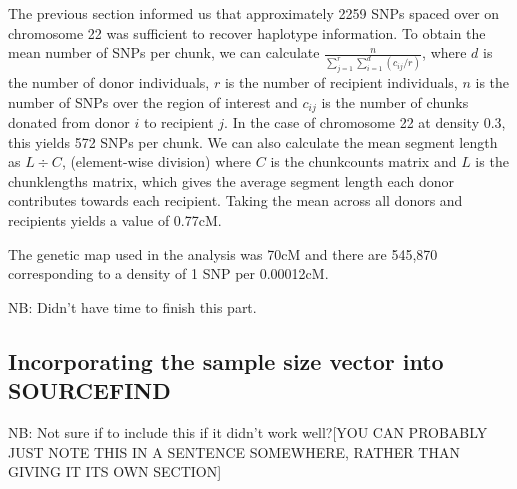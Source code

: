 The previous section informed us that approximately 2259 SNPs spaced over on chromosome 22 was sufficient to recover haplotype information. To obtain the mean number of SNPs per chunk, we can calculate $\frac{n}{\sum_{j=1}^{r} \sum_{i=1}^{d} (c_{ij}/r)}$, where $d$ is the number of donor individuals, $r$ is the number of recipient individuals, $n$ is the number of SNPs over the region of interest and $c_{ij}$ is the number of chunks donated from donor $i$ to recipient $j$. In the case of chromosome 22 at density 0.3, this yields 572 SNPs per chunk. We can also calculate the mean segment length as $L \div C$, (element-wise division) where $C$ is the chunkcounts matrix and $L$ is the  chunklengths matrix, which gives the average segment length each donor contributes towards each recipient. Taking the mean across all donors and recipients yields a value of 0.77cM. 

The genetic map used in the analysis was 70cM and there are 545,870 corresponding to a density of 1 SNP per 0.00012cM. 

NB: Didn't have time to finish this part. 


\subsection{Incorporating the sample size vector into SOURCEFIND}

NB: Not sure if to include this if it didn't work well?{\color{red}[YOU CAN PROBABLY JUST NOTE THIS IN A SENTENCE SOMEWHERE, RATHER THAN GIVING IT ITS OWN SECTION]}